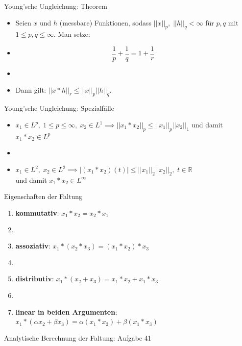 \documentclass[14pt, aspectratio=169, handout]{beamer}
\begin{document}
\begin{frame}{Young'sche Ungleichung: Theorem}
    \begin{itemize} 
        \item Seien $x$ und $h$ (messbare) Funktionen, sodass $||x||_p, \; ||h||_q < \infty$ für $p,q$ mit $1 \leq p,q \leq \infty$. Man setze:
        \item[] 
        $$\frac{1}{p} + \frac{1}{q} = 1 + \frac{1}{r}$$
        \item[] 
        \item[] Dann gilt: $||x \ast h||_r \leq ||x||_p||h||_q$.
    \end{itemize}
\end{frame}

\begin{frame}{Young'sche Ungleichung: Spezialfälle}
    \begin{itemize}
        \item $x_1 \in L^p, \; 1 \leq p \leq \infty, \; x_2 \in L^1 \implies ||x_1 \ast x_2 ||_p \leq ||x_1||_p ||x_2||_1$ und damit $x_1 \ast x_2 \in L^p$
        \item[] 
        \item $x_1 \in L^2, \; x_2 \in L^2 \implies |(x_1 \ast x_2 )(t)| \leq ||x_1||_2 ||x_2||_2, \; t \in \mathbb{R}$ \\und damit $x_1 \ast x_2 \in L^\infty$
    \end{itemize}
\end{frame}

\begin{frame}{Eigenschaften der Faltung}
    \begin{enumerate}
    \item \textbf{kommutativ}: $x_1 \ast x_2 = x_2 \ast x_1$
    \item[] 
    \item \textbf{assoziativ}: $x_1 \ast (x_2 \ast x_3) = (x_1 \ast x_2) \ast x_3$
    \item[] 
    \item \textbf{distributiv}: $x_1 \ast (x_2 + x_3) = x_1 \ast x_2 + x_1 \ast x_3$
    \item[] 
    \item \textbf{linear in beiden Argumenten}: $x_1 \ast (\alpha x_2 + \beta x_3) = \alpha (x_1 \ast x_2) + \beta (x_1 \ast x_3)$
\end{enumerate}
\end{frame}

\begin{frame}{Analytische Berechnung der Faltung: Aufgabe 41}
    
\end{frame}
\end{document}
